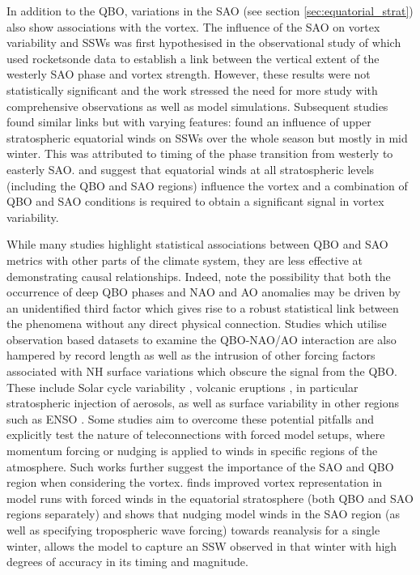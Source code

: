 In addition to the QBO, variations in the SAO (see section \ref{sec:equatorial_strat}) also show associations with the vortex. The influence of the SAO on vortex variability and SSWs was first hypothesised in the observational study of \cite{grayData2001} which used rocketsonde data to establish a link between the vertical extent of the westerly SAO phase and vortex strength. However, these results were not statistically significant and the work stressed the need for more study with comprehensive observations as well as model simulations. Subsequent studies found similar links but with varying features: \cite{grayinfluence2003} found an influence of upper stratospheric equatorial winds on SSWs over the whole season but mostly in mid winter. This was attributed to timing of the phase transition from westerly to easterly SAO. \cite{grayData2001} and \cite{hamiltonEffects1998} suggest that equatorial winds at all stratospheric levels (including the QBO and SAO regions) influence the vortex and a combination of QBO and SAO conditions is required to obtain a significant signal in vortex variability.

While many studies highlight statistical associations between QBO and SAO metrics with other parts of the climate system, they are less effective at demonstrating causal relationships. Indeed, \cite{andrewsObserved2019d} note the possibility that both the occurrence of deep QBO phases and NAO and AO anomalies may be driven by an unidentified third factor which gives rise to a robust statistical link between the phenomena without any direct physical connection. Studies which utilise observation based datasets to examine the QBO-NAO/AO interaction are also hampered by record length as well as the intrusion of other forcing factors associated with NH surface variations which obscure the signal from the QBO. These include Solar cycle variability \citep{GrayElevenyear2016}, volcanic eruptions \citep{stenchikovArctic2004}, in particular stratospheric injection of aerosols, as well as surface variability in other regions such as ENSO \citep{bellStratospheric2009}. Some studies aim to overcome these potential pitfalls and explicitly test the nature of teleconnections with forced model setups, where momentum forcing or nudging is applied to winds in specific regions of the atmosphere. Such works further suggest the importance of the SAO and QBO region when considering the vortex. \cite{pascoeQuasibiennial2005b} finds improved vortex representation in model runs with forced winds in the equatorial stratosphere (both QBO and SAO regions separately) and \cite{grayForecasting2020a} shows that nudging model winds in the SAO region (as well as specifying tropospheric wave forcing) towards reanalysis for a single winter, allows the model to capture an SSW observed in that winter with high degrees of accuracy in its timing and magnitude.   

